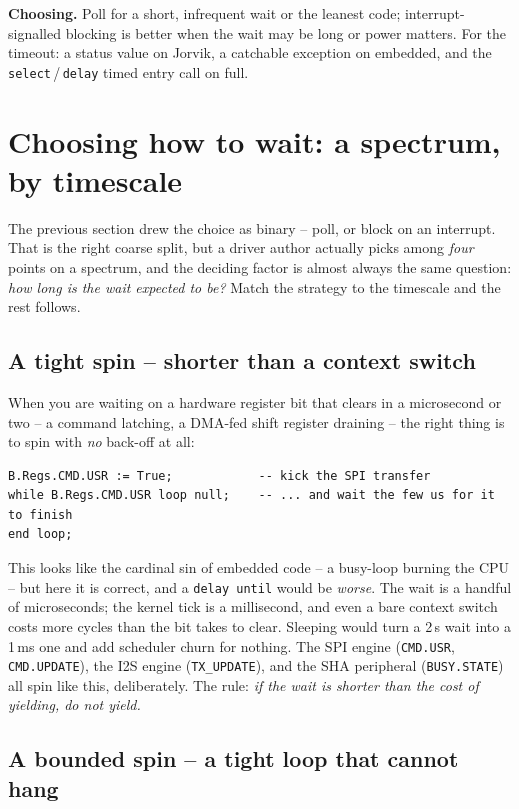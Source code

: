 \textbf{Choosing.} Poll for a short, infrequent wait or the leanest code;
interrupt-signalled blocking is better when the wait may be long or power matters.
For the timeout: a status value on Jorvik, a catchable exception on embedded, and
the \texttt{select}\,/\,\texttt{delay} timed entry call on full.

\section{Choosing how to wait: a spectrum, by timescale}
\label{sec:wait-spectrum}

The previous section drew the choice as binary -- poll, or block on an interrupt.
That is the right coarse split, but a driver author actually picks among
\emph{four} points on a spectrum, and the deciding factor is almost always the
same question: \emph{how long is the wait expected to be?} Match the strategy to
the timescale and the rest follows.

\subsection{A tight spin -- shorter than a context switch}

When you are waiting on a hardware register bit that clears in a microsecond or
two -- a command latching, a DMA-fed shift register draining -- the right thing
is to spin with \emph{no} back-off at all:

\begin{lstlisting}
B.Regs.CMD.USR := True;            -- kick the SPI transfer
while B.Regs.CMD.USR loop null;    -- ... and wait the few us for it to finish
end loop;
\end{lstlisting}

This looks like the cardinal sin of embedded code -- a busy-loop burning the CPU
-- but here it is correct, and a \texttt{delay until} would be \emph{worse}. The
wait is a handful of microseconds; the kernel tick is a millisecond, and even a
bare context switch costs more cycles than the bit takes to clear. Sleeping would
turn a 2\,\textmu s wait into a 1\,ms one and add scheduler churn for nothing. The
SPI engine (\texttt{CMD.USR}, \texttt{CMD.UPDATE}), the I2S engine
(\texttt{TX\_UPDATE}), and the SHA peripheral (\texttt{BUSY.STATE}) all spin like
this, deliberately. The rule: \emph{if the wait is shorter than the cost of
yielding, do not yield.}

\subsection{A bounded spin -- a tight loop that cannot hang}

